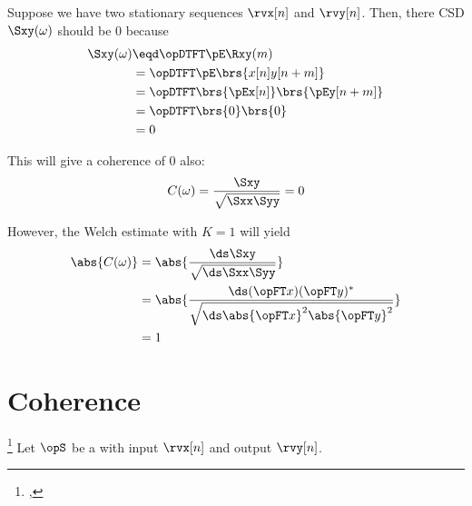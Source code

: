 \begin{example}[The K=1 Welch estimate of coherence]
Suppose we have two  stationary sequences $\rvx[n]$ and $\rvy[n]$. Then, there
CSD $\Sxy(\omega)$ should be $0$ because
\begin{align*}
  \Sxy(\omega)
    &\eqd \opDTFT\pE\Rxy(m)
  \\&=    \opDTFT\pE\brs{x[n]y[n+m]}
  \\&=    \opDTFT\brs{\pEx[n]} \brs{\pEy[n+m]}
  \\&=    \opDTFT\brs{0} \brs{0}
  \\&=    0
\end{align*}

This will give a coherence of $0$ also:
\[ C(\omega) = \frac{\Sxy}{\sqrt{\Sxx\Syy}} = 0\]

However, the Welch estimate with $K=1$ will yield
\begin{align*}
  \abs{C(\omega)}
    &= \abs{\frac{\ds\Sxy}{\sqrt{\ds\Sxx\Syy}}}
  \\&= \abs{\frac{\ds (\opFT x)(\opFT y)^\ast}{\sqrt{\ds\abs{\opFT x}^2\abs{\opFT y}^2}}}
  \\&= 1
\end{align*}

\end{example}



\section{Coherence}
\begin{definition}
\footnote{
  ,
  }
Let $\opS$ be a  with input $\rvx[n]$ and output $\rvy[n]$.
\end{definition}
